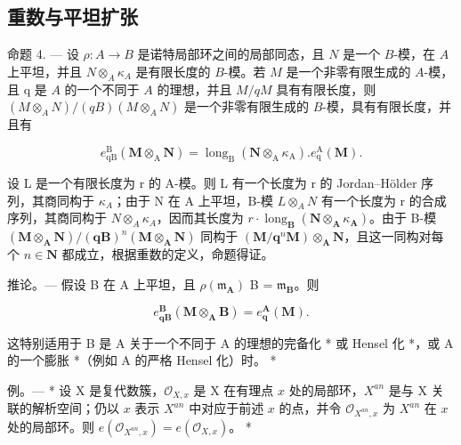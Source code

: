 \subsection{重数与平坦扩张}

命题 4. — 设 \(\rho: A \to B\) 是诺特局部环之间的局部同态，且 \(N\) 是一个 \(B\)-模，在 \(A\) 上平坦，并且 \(N \otimes_A \kappa_A\) 是有限长度的 \(B\)-模。若 \(M\) 是一个非零有限生成的 \(A\)-模，且 q 是 \(A\) 的一个不同于 \(A\) 的理想，并且 \(M/qM\) 具有有限长度，则 \((M \otimes_A N)/(qB)(M \otimes_A N)\) 是一个非零有限生成的 \(B\)-模，具有有限长度，并且有

\[
e _ {\mathrm{qB}} ^ {\mathrm{B}} (\mathbf {M} \otimes_ {\mathrm{A}} \mathbf {N}) = \operatorname{long} _ {\mathrm{B}} (\mathbf {N} \otimes_ {\mathrm{A}} \kappa_ {\mathrm{A}}). e _ {\mathrm{q}} ^ {\mathrm{A}} (\mathbf {M}).
\]

设 L 是一个有限长度为 r 的 A-模。则 L 有一个长度为 r 的 Jordan–Hölder 序列，其商同构于 \(\kappa_{A}\)；由于 N 在 A 上平坦，B-模 \(L \otimes_{A} N\) 有一个长度为 r 的合成序列，其商同构于 \(N \otimes_{A} \kappa_{A}\)，因而其长度为 \(r \cdot \operatorname{long}_{\mathbf{B}}(\mathbf{N} \otimes_{\mathbf{A}} \kappa_{\mathbf{A}})\)。由于 B-模 \((\mathbf{M} \otimes_{\mathbf{A}} \mathbf{N})/(\mathbf{q}\mathbf{B})^{n}(\mathbf{M} \otimes_{\mathbf{A}} \mathbf{N})\) 同构于 \((\mathbf{M}/\mathbf{q}^{n}\mathbf{M}) \otimes_{\mathbf{A}} \mathbf{N}\)，且这一同构对每个 \(n \in \mathbf{N}\) 都成立，根据重数的定义，命题得证。

推论。— 假设 B 在 A 上平坦，且 \(\rho(\mathfrak{m}_{\mathbf{A}})\) B = \(\mathfrak{m}_{\mathbf{B}}\)。则

\[
e _ {\mathbf {q B}} ^ {\mathbf {B}} (\mathbf {M} \otimes_ {\mathbf {A}} \mathbf {B}) = e _ {\mathbf {q}} ^ {\mathbf {A}} (\mathbf {M}).
\]

这特别适用于 B 是 A 关于一个不同于 A 的理想的完备化 * 或 Hensel 化 *，或 A 的一个膨胀 *（例如 A 的严格 Hensel 化）时。 *

例。— * 设 X 是复代数簇，\(\mathcal{O}_{X,x}\) 是 X 在有理点 \(x\) 处的局部环，\(X^{an}\) 是与 X 关联的解析空间；仍以 \(x\) 表示 \(X^{an}\) 中对应于前述 \(x\) 的点，并令 \(\mathcal{O}_{X^{an},x}\) 为 \(X^{an}\) 在 \(x\) 处的局部环。则 \(e(\mathcal{O}_{X^{an},x}) = e(\mathcal{O}_{X,x})\)。 *

